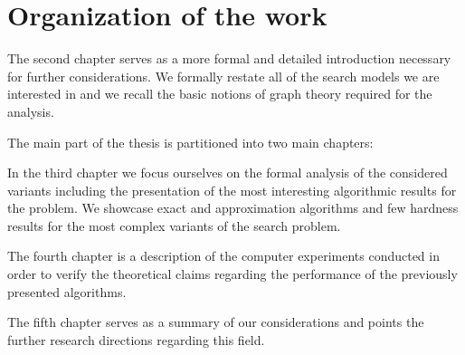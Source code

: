
\section{Organization of the work}
The second chapter serves as a more formal and detailed introduction necessary for further considerations. We formally restate all of the search models we are interested in and we recall the basic notions of graph theory required for the analysis.

The main part of the thesis is partitioned into two main chapters:

In the third chapter we focus ourselves on the formal analysis of the considered variants including the presentation of the most interesting algorithmic results for the problem. We showcase exact and approximation algorithms and few hardness results for the most complex variants of the search problem. 

The fourth chapter is a description of the computer experiments conducted in order to verify the theoretical claims regarding the performance of the previously presented algorithms.

The fifth chapter serves as a summary of our considerations and points the further research directions regarding this field.
